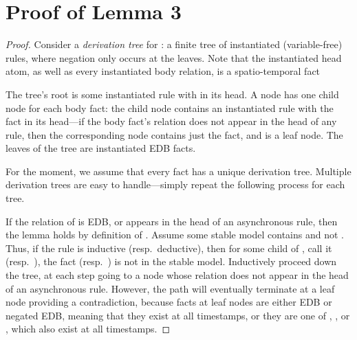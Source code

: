 \section{Proof of Lemma 3}
\begin{proof}
Consider a {\em derivation tree} for : a finite tree of instantiated (variable-free) rules, where negation only occurs at the leaves.  Note that the instantiated head atom, as well as every instantiated body relation, is a spatio-temporal fact

The tree's root is some instantiated rule with  in its head.  A node has one child node for each body fact: the child node contains an instantiated rule with the fact in its head---if the body fact's relation does not appear in the head of any rule, then the corresponding node contains just the fact, and is a leaf node.  The leaves of the tree are instantiated EDB facts.

For the moment, we assume that every fact has a unique derivation tree.  Multiple derivation trees are easy to handle---simply repeat the following process for each tree.

If the relation of  is EDB, or appears in the head of an asynchronous rule, then the lemma holds by definition of \slang.  Assume some stable model contains  and not .  Thus, if the rule is inductive (resp.\ deductive), then for some child of , call it  (resp.\ ), the fact  (resp.\ ) is not in the stable model.  Inductively proceed down the tree, at each step going to a node whose relation does not appear in the head of an asynchronous rule.  However, the path will eventually terminate at a leaf node providing a contradiction, because facts at leaf nodes are either EDB or negated EDB, meaning that they exist at all timestamps, or they are one of , , or \dedalus{<}, which also exist at all timestamps.
\end{proof}

